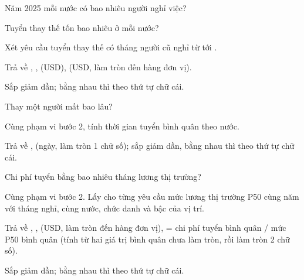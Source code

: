 \documentclass[11pt,a4paper]{article}
\begin{document}
\begin{cauhoi}
\begin{buoc}[ma=b1, diem=10, hinhthuc=write, bang={employee_monthly_snapshot}]{Năm 2025 mỗi nước có bao nhiêu người nghỉ việc?}
\begin{yeucau}
  \end{yeucau}
\end{buoc}
\begin{buoc}[ma=b2, diem=10, hinhthuc=write, bang={recruiting_pipeline}]{Tuyển thay thế tốn bao nhiêu ở mỗi nước?}
  \begin{yeucau}
    \item Xét yêu cầu tuyển thay thế có tháng người cũ nghỉ từ  tới .
    \item Trả về , ,  (USD),  (USD, làm tròn đến hàng đơn vị).
    \item Sắp  giảm dần; bằng nhau thì  theo thứ tự chữ cái.
  \end{yeucau}
\end{buoc}
\begin{buoc}[ma=b3, diem=10, hinhthuc=write, bang={recruiting_pipeline}]{Thay một người mất bao lâu?}
  \begin{yeucau}
    \item Cùng phạm vi bước 2, tính thời gian tuyển bình quân theo nước.
    \item Trả về ,  (ngày, làm tròn 1 chữ số); sắp  giảm dần, bằng nhau thì  theo thứ tự chữ cái.
  \end{yeucau}
\end{buoc}
\begin{buoc}[ma=b4, diem=10, hinhthuc=write, bang={recruiting_pipeline, positions, country_market_benchmark}]{Chi phí tuyển bằng bao nhiêu tháng lương thị trường?}
  \begin{yeucau}
    \item Cùng phạm vi bước 2. Lấy cho từng yêu cầu mức lương thị trường P50 cùng năm với tháng nghỉ, cùng nước, chức danh và bậc của vị trí.
    \item Trả về , ,  (USD, làm tròn đến hàng đơn vị),  = chi phí tuyển bình quân / mức P50 bình quân (tính từ hai giá trị bình quân chưa làm tròn, rồi làm tròn 2 chữ số).
    \item Sắp  giảm dần; bằng nhau thì  theo thứ tự chữ cái.

\end{yeucau}
\end{buoc}
\end{cauhoi}
\end{document}
